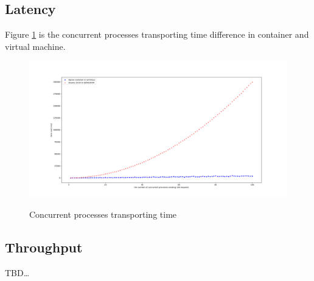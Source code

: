 \subsection{Latency}
Figure \ref{conc} is the concurrent processes transporting time
difference in container and virtual machine.
\begin{figure}
    \centering
    \includegraphics[width=\textwidth]{src/concurrent.png}
    \label{conc}
    \caption{Concurrent processes transporting time}
\end{figure}

\subsection{Throughput}
TBD\dots